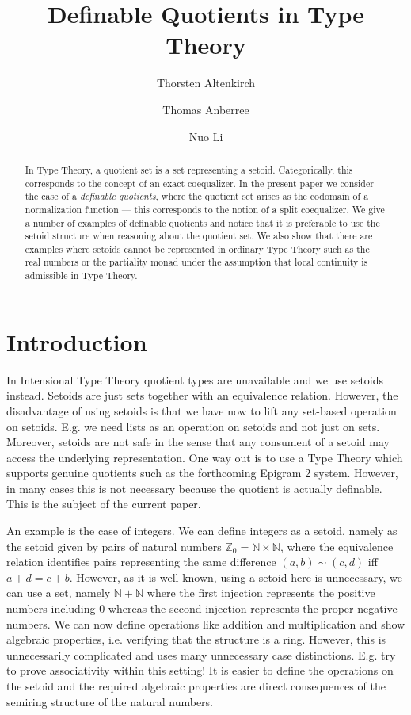 \documentclass[envcountsame]{llncs}
\title{Definable Quotients in Type Theory}
\author{Thorsten Altenkirch \inst{1}
   \and Thomas   Anberree   \inst{2}
   \and Nuo      Li         \inst{2}}
\institute{
School of Computer Science, University of Nottingham, Jubilee Campus, Wollaton Road, Nottingham, NG8 1BB, UK
\and
School of Computer Science, University of Nottingham, Ningbo Campus, 199 Taikang East Road, Ningbo, 315100, China}
\newcommand{\N}{\mathbb{N}}
\newcommand{\Z}{\mathbb{Z}}
\begin{document}
\maketitle

\begin{abstract}
  In Type Theory, a quotient set is a set representing a setoid.
  Categorically, this corresponds to the concept of an exact
  coequalizer. In the present paper we consider the case of a
  \emph{definable quotients}, where the quotient set arises as the
  codomain of a normalization function --- this corresponds to the
  notion of a split coequalizer.  We give a number of examples of
  definable quotients and notice that it is preferable to use the
  setoid structure when reasoning about the quotient set. We also show
  that there are examples where setoids cannot be represented in
  ordinary Type Theory such as the real numbers or the partiality
  monad under the assumption that local continuity is admissible in
  Type Theory.
\end{abstract}

\section{Introduction}\label{sec:introduction}

In Intensional Type Theory quotient types are unavailable and we use
setoids instead. Setoids are just sets together with an equivalence
relation. However, the disadvantage of using setoids is that we have
now to lift any set-based operation on setoids. E.g. we need lists as
an operation on setoids and not just on sets. Moreover, setoids are
not safe in the sense that any consument of a setoid may access the
underlying representation. One way out is to use a Type Theory which
supports genuine quotients such as the forthcoming Epigram 2 system. 
However, in many cases this is not necessary because the quotient is
actually definable. This is the subject of the current paper.

An example is the case of integers. We can define integers as a
setoid, namely as the setoid given by pairs of natural numbers 
$\Z_0=\N\times\N$, where the equivalence relation identifies pairs
representing the same difference $(a,b)\sim(c,d)$ if{f} $a+d=c+b$.
However, as it is well known, using a setoid here is unnecessary, we
can use a set, namely $\N+\N$ where the first injection represents the
positive numbers including $0$ whereas the second injection represents
the proper negative numbers. We can now define operations like
addition and multiplication and show algebraic properties,
i.e. verifying that the structure is a ring. However, this is
unnecessarily complicated and uses many unnecessary case
distinctions. E.g. try to prove associativity within this setting!
It is easier to define the operations on the setoid and the required
algebraic properties are direct consequences of the semiring structure
of the natural numbers. 
\end{document}
